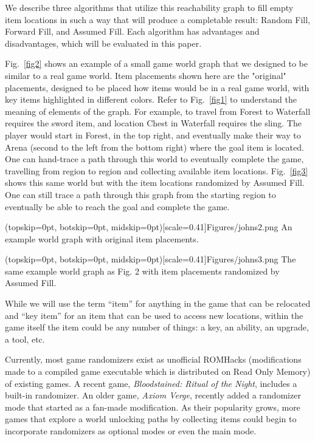 \documentclass{ieeeaccess}
\begin{document}
We describe three algorithms that utilize this reachability graph to fill empty item locations
in such a way that will produce a completable result: Random Fill, Forward Fill, and Assumed
Fill. Each algorithm has advantages and disadvantages, which will be evaluated in this paper.

Fig.~\ref{fig2} shows an example of a small game world graph that we designed to be similar to a
real game world. Item placements shown here are the "original" placements, designed to be placed
how items would be in a real game world, with key items highlighted in different colors. Refer to
Fig.~\ref{fig1} to understand the meaning of elements of the graph. For example, to travel from 
Forest to Waterfall requires the sword item, and location Chest in Waterfall requires the sling. 
The player would start in Forest, in the top right, and eventually make their way to Arena 
(second to the left from the bottom right) where the goal item is located. One can hand-trace 
a path through this world to eventually complete the game, travelling from region to region and
collecting available item locations. Fig.~\ref{fig3} shows this same world but with the item 
locations randomized by Assumed Fill. One can still trace a path through this graph from the 
starting region to eventually be able to reach the goal and complete the game.

\Figure[t!](topskip=0pt, botskip=0pt, midskip=0pt)[scale=0.41]{Figures/johns2.png}
{An example world graph with original item placements.\label{fig2}}

\Figure[t!](topskip=0pt, botskip=0pt, midskip=0pt)[scale=0.41]{Figures/johns3.png}
{The same example world graph as Fig. 2 with item placements randomized by Assumed
Fill.\label{fig3}}

While we will use the term “item” for anything in the game that can be relocated and “key item”
for an item that can be used to access new locations, within the game itself the item could be
any number of things: a key, an ability, an upgrade, a tool, etc.

Currently, most game randomizers exist as unofficial ROMHacks (modifications made to a 
compiled game executable which is distributed on Read Only Memory) of existing games. 
A recent game, \textit{Bloodstained: Ritual of the Night}, includes a built-in randomizer.
An older game, \textit{Axiom Verge}, recently added a randomizer mode that started 
as a fan-made modification.
As their popularity grows, more games that explore a world unlocking paths by collecting items
could begin to incorporate randomizers as optional modes or even the main mode.
\end{document}
